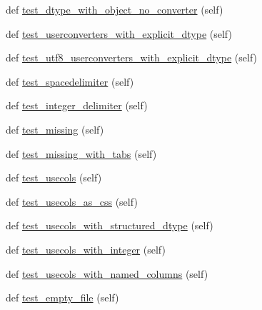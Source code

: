 \begin{DoxyCompactItemize}
\item 
def \hyperlink{classnumpy_1_1lib_1_1tests_1_1test__io_1_1TestFromTxt_a4f977a3387fdd80c41f615591a065bf7}{test\+\_\+dtype\+\_\+with\+\_\+object\+\_\+no\+\_\+converter} (self)
\item 
def \hyperlink{classnumpy_1_1lib_1_1tests_1_1test__io_1_1TestFromTxt_a298c4ada2fd5b5bc8b2acfa0d21e2736}{test\+\_\+userconverters\+\_\+with\+\_\+explicit\+\_\+dtype} (self)
\item 
def \hyperlink{classnumpy_1_1lib_1_1tests_1_1test__io_1_1TestFromTxt_a73254fb84ffc0e51180c36ed72ee0ae1}{test\+\_\+utf8\+\_\+userconverters\+\_\+with\+\_\+explicit\+\_\+dtype} (self)
\item 
def \hyperlink{classnumpy_1_1lib_1_1tests_1_1test__io_1_1TestFromTxt_a240069dc27c7f886c3747aede0fb0515}{test\+\_\+spacedelimiter} (self)
\item 
def \hyperlink{classnumpy_1_1lib_1_1tests_1_1test__io_1_1TestFromTxt_a59baa01cae3a3f10b4ef7febdb84c58b}{test\+\_\+integer\+\_\+delimiter} (self)
\item 
def \hyperlink{classnumpy_1_1lib_1_1tests_1_1test__io_1_1TestFromTxt_a5d6cf62942b0151074994985fac68d6b}{test\+\_\+missing} (self)
\item 
def \hyperlink{classnumpy_1_1lib_1_1tests_1_1test__io_1_1TestFromTxt_a5e39081e3d774483070958677aadd0b5}{test\+\_\+missing\+\_\+with\+\_\+tabs} (self)
\item 
def \hyperlink{classnumpy_1_1lib_1_1tests_1_1test__io_1_1TestFromTxt_a221d34872eb6bb1aa13cdb7c0e8362bb}{test\+\_\+usecols} (self)
\item 
def \hyperlink{classnumpy_1_1lib_1_1tests_1_1test__io_1_1TestFromTxt_a1fbd9d15536ff50f4d9423e160cf21fc}{test\+\_\+usecols\+\_\+as\+\_\+css} (self)
\item 
def \hyperlink{classnumpy_1_1lib_1_1tests_1_1test__io_1_1TestFromTxt_a5cb9e75f11af0d5be024daafd0237d92}{test\+\_\+usecols\+\_\+with\+\_\+structured\+\_\+dtype} (self)
\item 
def \hyperlink{classnumpy_1_1lib_1_1tests_1_1test__io_1_1TestFromTxt_a05fb851b37cb6919aee91d2fc9882c80}{test\+\_\+usecols\+\_\+with\+\_\+integer} (self)
\item 
def \hyperlink{classnumpy_1_1lib_1_1tests_1_1test__io_1_1TestFromTxt_a54c144a8c527348f4ae62f6c35ee6a72}{test\+\_\+usecols\+\_\+with\+\_\+named\+\_\+columns} (self)
\item 
def \hyperlink{classnumpy_1_1lib_1_1tests_1_1test__io_1_1TestFromTxt_a72d4278a5d0d78bd6c2a7df0495bffd1}{test\+\_\+empty\+\_\+file} (self)
\item 

\end{DoxyCompactItemize}
